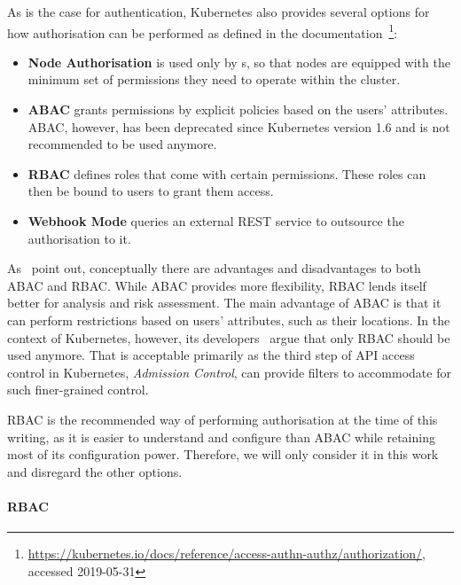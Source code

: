 As is the case for authentication, Kubernetes also provides several options for how authorisation can be performed as defined in the documentation~\textcite{k8sdocs}\footnote{\url{https://kubernetes.io/docs/reference/access-authn-authz/authorization/}, accessed 2019-05-31}:

\begin{itemize}
    \item \textbf{Node Authorisation} is used only by s, so that nodes are equipped with the minimum set of permissions they need to operate within the cluster.
    \item \textbf{\ac{ABAC}} grants permissions by explicit policies based on the users' attributes. \ac{ABAC}, however, has been deprecated since Kubernetes version 1.6 and is not recommended to be used anymore.
    \item \textbf{\ac{RBAC}} defines roles that come with certain permissions. These roles can then be bound to users to grant them access.
    \item \textbf{Webhook Mode} queries an external REST service to outsource the authorisation to it.
\end{itemize}

As~\textcite{ABACvsRBAC} point out, conceptually there are advantages and disadvantages to both \ac{ABAC} and \ac{RBAC}. While \ac{ABAC} provides more flexibility, \ac{RBAC} lends itself better for analysis and risk assessment. The main advantage of \ac{ABAC} is that it can perform restrictions based on users' attributes, such as their locations. In the context of Kubernetes, however, its developers~\textcite{ABACvsRBACk8s} argue that only \ac{RBAC} should be used anymore. That is acceptable primarily as the third step of API access control in Kubernetes, \textit{Admission Control}, can provide filters to accommodate for such finer-grained control.

\ac{RBAC} is the recommended way of performing authorisation at the time of this writing, as it is easier to understand and configure than \ac{ABAC} while retaining most of its configuration power. Therefore, we will only consider it in this work and disregard the other options.

\paragraph{\ac{RBAC}}



